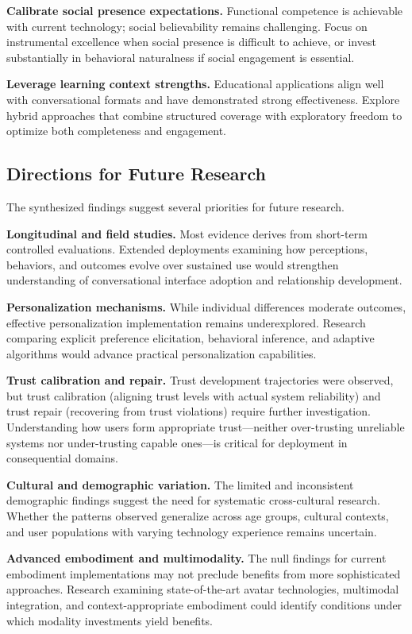 \documentclass[manuscript,anonymous,sigconf]{acmart}
\begin{document}
\textbf{Calibrate social presence expectations.} Functional competence is achievable with current technology; social believability remains challenging. Focus on instrumental excellence when social presence is difficult to achieve, or invest substantially in behavioral naturalness if social engagement is essential.

\textbf{Leverage learning context strengths.} Educational applications align well with conversational formats and have demonstrated strong effectiveness. Explore hybrid approaches that combine structured coverage with exploratory freedom to optimize both completeness and engagement.

\subsection{Directions for Future Research}

The synthesized findings suggest several priorities for future research.

\textbf{Longitudinal and field studies.} Most evidence derives from short-term controlled evaluations. Extended deployments examining how perceptions, behaviors, and outcomes evolve over sustained use would strengthen understanding of conversational interface adoption and relationship development.

\textbf{Personalization mechanisms.} While individual differences moderate outcomes, effective personalization implementation remains underexplored. Research comparing explicit preference elicitation, behavioral inference, and adaptive algorithms would advance practical personalization capabilities.

\textbf{Trust calibration and repair.} Trust development trajectories were observed, but trust calibration (aligning trust levels with actual system reliability) and trust repair (recovering from trust violations) require further investigation. Understanding how users form appropriate trust---neither over-trusting unreliable systems nor under-trusting capable ones---is critical for deployment in consequential domains.

\textbf{Cultural and demographic variation.} The limited and inconsistent demographic findings suggest the need for systematic cross-cultural research. Whether the patterns observed generalize across age groups, cultural contexts, and user populations with varying technology experience remains uncertain.

\textbf{Advanced embodiment and multimodality.} The null findings for current embodiment implementations may not preclude benefits from more sophisticated approaches. Research examining state-of-the-art avatar technologies, multimodal integration, and context-appropriate embodiment could identify conditions under which modality investments yield benefits.
\end{document}
